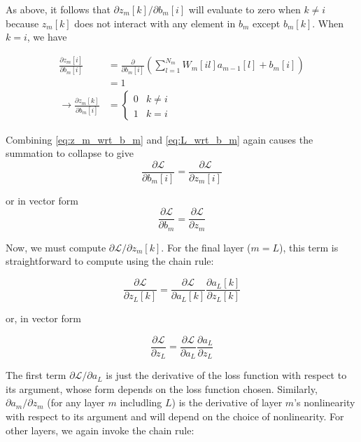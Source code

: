 As above, it follows that $\partial z_m[k]/\partial b_m[i]$ will evaluate to zero when $k \ne i$ because $z_m[k]$ does not interact with any element in $b_m$ except $b_m[k]$.  When $k = i$, we have

\begin{align}
\frac{\partial z_m[i]}{\partial b_m[i]} &= \frac{\partial}{\partial b_m[i]}\left(\sum_{l = 1}^{N_m} W_m[il] a_{m - 1}[l] + b_m[i]\right)\\
                                        &= 1\\
\rightarrow \frac{\partial z_m[k]}{\partial b_m[i]} &= \begin{cases}
0 & k \ne i\\
1 & k = i
\end{cases}
\label{eq:z_m_wrt_b_m}
\end{align}

Combining \cref{eq:z_m_wrt_b_m} and \cref{eq:L_wrt_b_m} again causes the summation to collapse to give
\begin{equation}
\frac{\partial \mathcal{L}}{\partial b_m[i]} = \frac{\partial \mathcal{L}}{\partial z_m[i]}
\end{equation}

or in vector form
\begin{equation}
\frac{\partial \mathcal{L}}{\partial b_m} = \frac{\partial \mathcal{L}}{\partial z_m}
\end{equation}

Now, we must compute $\partial \mathcal{L}/\partial z_m[k]$.
For the final layer ($m = L$), this term is straightforward to compute using the chain rule:

\begin{equation}
        \frac{\partial \mathcal{L}}{\partial z_L[k]} = \frac{\partial \mathcal{L}}{\partial a_L[k]} \frac{\partial a_L[k]}{\partial z_L[k]}
\end{equation}

or, in vector form

\begin{equation}
        \frac{\partial \mathcal{L}}{\partial z_L} = \frac{\partial \mathcal{L}}{\partial a_L} \frac{\partial a_L}{\partial z_L}
\end{equation}

The first term $\partial \mathcal{L}/\partial a_L$ is just the derivative of the loss function with respect to its argument, whose form depends on the loss function chosen.
Similarly, $\partial a_m/\partial z_m$ (for any layer $m$ includling $L$) is the derivative of layer $m$'s nonlinearity with respect to its argument and will depend on the choice of nonlinearity.
For other layers, we again invoke the chain rule:

